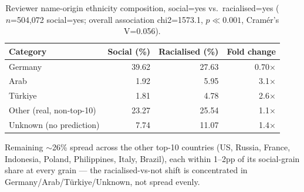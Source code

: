 
\begin{table}[htbp]
\centering
\footnotesize
\setlength{\tabcolsep}{4pt}
\caption{Reviewer name-origin ethnicity composition, social=yes vs.\ racialised=yes ($n$=504,072 social=yes; overall association chi2=1573.1, $p\ll0.001$, Cram\'er's V=0.056).}
\label{tab:who-ethnicity-composition}
\begin{tabular}{@{} l r r r @{}}
\toprule
Category & Social (\%) & Racialised (\%) & Fold change \\
\midrule
Germany & 39.62 & 27.63 & 0.70$\times$ \\
Arab & 1.92 & 5.95 & 3.1$\times$ \\
T\"urkiye & 1.81 & 4.78 & 2.6$\times$ \\
Other (real, non-top-10) & 23.27 & 25.54 & 1.1$\times$ \\
Unknown (no prediction) & 7.74 & 11.07 & 1.4$\times$ \\
\bottomrule
\end{tabular}

\vspace{2pt}
\raggedright\footnotesize
Remaining $\sim$26\% spread across the other top-10 countries (US, Russia, France, Indonesia, Poland, Philippines, Italy, Brazil), each within 1--2pp of its social-grain share at every grain --- the racialised-vs-not shift is concentrated in Germany/Arab/T\"urkiye/Unknown, not spread evenly.
\end{table}

